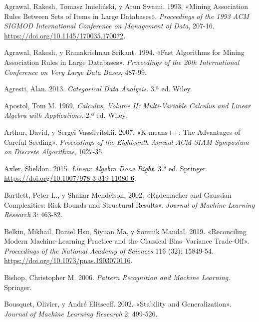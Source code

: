 \documentclass[
  spanish,
  10.5pt,
  letterpaper,
  DIV=11,
  numbers=noendperiod,
  oneside,
  open=any]{scrreprt}
\newlength{\cslhangindent}
\newenvironment{CSLReferences}[2] %
 {\begin{list}{}{%
  \setlength{\itemindent}{0pt}
  \setlength{\leftmargin}{0pt}
  \setlength{\parsep}{0pt}
  \ifodd #1
   \setlength{\leftmargin}{\cslhangindent}
   \setlength{\itemindent}{-1\cslhangindent}
  \fi
  \setlength{\itemsep}{#2\baselineskip}}}
 {\end{list}}
\theoremstyle{definition}
\theoremstyle{definition}
\theoremstyle{plain}
\theoremstyle{remark}
\begin{document}

\protect{}\label{refs}
\begin{CSLReferences}{1}{1}
Agrawal, Rakesh, Tomasz Imieliński, y Arun Swami. 1993. {«Mining
Association Rules Between Sets of Items in Large Databases»}.
\emph{Proceedings of the 1993 ACM SIGMOD International Conference on
Management of Data}, 207-16.
\url{https://doi.org/10.1145/170035.170072}.

Agrawal, Rakesh, y Ramakrishnan Srikant. 1994. {«Fast Algorithms for
Mining Association Rules in Large Databases»}. \emph{Proceedings of the
20th International Conference on Very Large Data Bases}, 487-99.

Agresti, Alan. 2013. \emph{Categorical Data Analysis}. 3.ª ed. Wiley.

Apostol, Tom M. 1969. \emph{Calculus, Volume II: Multi-Variable Calculus
and Linear Algebra with Applications}. 2.ª ed. Wiley.

Arthur, David, y Sergei Vassilvitskii. 2007. {«K-means++: The Advantages
of Careful Seeding»}. \emph{Proceedings of the Eighteenth Annual
ACM-SIAM Symposium on Discrete Algorithms}, 1027-35.

Axler, Sheldon. 2015. \emph{Linear Algebra Done Right}. 3.ª ed.
Springer. \url{https://doi.org/10.1007/978-3-319-11080-6}.

Bartlett, Peter L., y Shahar Mendelson. 2002. {«Rademacher and Gaussian
Complexities: Risk Bounds and Structural Results»}. \emph{Journal of
Machine Learning Research} 3: 463-82.

Belkin, Mikhail, Daniel Hsu, Siyuan Ma, y Soumik Mandal. 2019.
{«Reconciling Modern Machine-Learning Practice and the Classical
Bias--Variance Trade-Off»}. \emph{Proceedings of the National Academy of
Sciences} 116 (32): 15849-54.
\url{https://doi.org/10.1073/pnas.1903070116}.

Bishop, Christopher M. 2006. \emph{Pattern Recognition and Machine
Learning}. Springer.

Bousquet, Olivier, y André Elisseeff. 2002. {«Stability and
Generalization»}. \emph{Journal of Machine Learning Research} 2:
499-526.


\end{CSLReferences}
\end{document}
